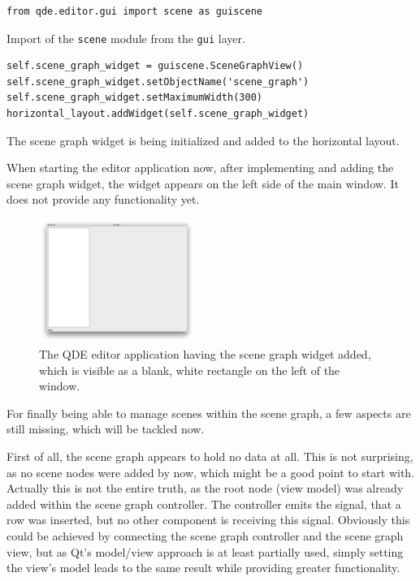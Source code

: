 \documentclass[10pt, openright, notitlepage]{scrreprt}
\begin{document}
\begin{listing}[H]
\begin{verbatim}
from qde.editor.gui import scene as guiscene
\end{verbatim}
\caption{\label{main-window-project-imports}
Import of the \texttt{scene} module from the \texttt{gui} layer.}
\end{listing}

\begin{listing}[H]
\begin{verbatim}
self.scene_graph_widget = guiscene.SceneGraphView()
self.scene_graph_widget.setObjectName('scene_graph')
self.scene_graph_widget.setMaximumWidth(300)
horizontal_layout.addWidget(self.scene_graph_widget)
\end{verbatim}
\caption{\label{main-window-setupui-scenegraph}
The scene graph widget is being initialized and added to the horizontal layout.}
\end{listing}

When starting the editor application now, after implementing and adding the
scene graph widget, the widget appears on the left side of the main window. It
does not provide any functionality yet.

\begin{figure}[H]
\centering
\includegraphics[width=2in]{./images/qde_alpha_02.png}
\caption{\label{fig:editor-alpha-02}
The QDE editor application having the scene graph widget added, which is visible as a blank, white rectangle on the left of the window.}
\end{figure}

For finally being able to manage scenes within the scene graph, a few aspects
are still missing, which will be tackled now.

First of all, the scene graph appears to hold no data at all. This is not
surprising, as no scene nodes were added by now, which might be a good point to
start with. Actually this is not the entire truth, as the root node (view model)
was already added within the scene graph controller. The controller emits the
signal, that a row was inserted, but no other component is receiving this
signal. Obviously this could be achieved by connecting the scene graph
controller and the scene graph view, but as Qt's model/view approach is at least
partially used, simply setting the view's model leads to the same result while
providing greater functionality.
\end{document}
